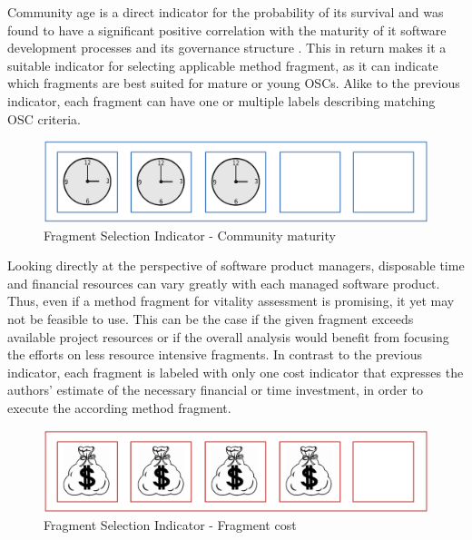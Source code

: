\documentclass[final,5p,times,twocolumn]{elsarticle}
\begin{document}
Community age is a direct indicator for the probability of its survival and was found to have a significant positive correlation with the maturity of it software development processes and its governance structure \cite{Samoladas2010}. This in return makes it a suitable indicator for selecting applicable method fragment, as it can indicate which fragments are best suited for mature or young OSCs. Alike to the previous indicator, each fragment can have one or multiple labels describing matching OSC criteria.
\begin{figure}[htp]
\begin{center}
\includegraphics[scale=0.15]{figures/situational_factor_community_maturity.PNG}
\caption{Fragment Selection Indicator - ­Community maturity}
\label{fig:ratio_community_maturity}
\end{center}
\end{figure} 
Looking directly at the perspective of software product managers, disposable time and financial resources can vary greatly with each managed software product. Thus, even if a method fragment for vitality assessment is promising, it yet may not be feasible to use. This can be the case if the given fragment exceeds available project resources or if the overall analysis would benefit from focusing the efforts on less resource intensive fragments. In contrast to the previous indicator, each fragment is labeled with only one cost indicator that expresses the authors' estimate of the necessary financial or time investment, in order to execute the according method fragment.
\begin{figure}[htp]
\begin{center}
\includegraphics[scale=0.15]{figures/situational_factor_resource_investment.PNG}
\caption{Fragment Selection Indicator - ­Fragment cost}
\label{fig:ratio_fragment_cost}
\end{center}
\end{figure}   
\end{document}
